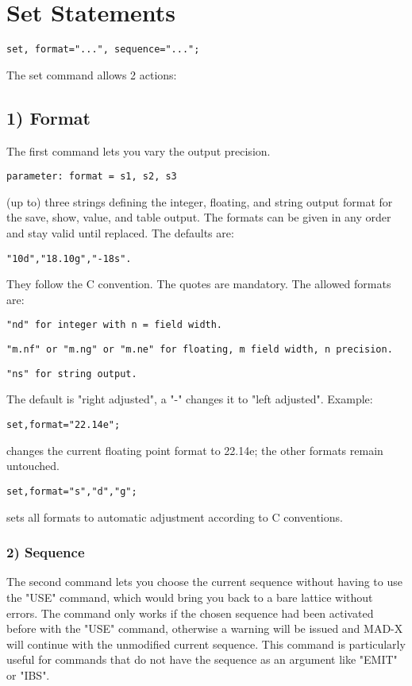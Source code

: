 
\section{Set Statements}

\begin{verbatim}
set, format="...", sequence="...";
\end{verbatim} 

The set command allows 2 actions: 
\subsection{1) Format} 
The first command lets you vary the output precision. 
\begin{verbatim}
parameter: format = s1, s2, s3
\end{verbatim} 
(up to) three strings defining the integer, floating, and string output
format for the save, show, value, and table output. The formats can be
given in any order and stay valid until replaced. The defaults are:  
\begin{verbatim}
"10d","18.10g","-18s".
\end{verbatim} 
They follow the C convention. The quotes are mandatory. The allowed formats are: 
\begin{verbatim}
"nd" for integer with n = field width.
\end{verbatim}
\begin{verbatim}
"m.nf" or "m.ng" or "m.ne" for floating, m field width, n precision.
\end{verbatim}
\begin{verbatim}
"ns" for string output.
\end{verbatim} 
The default is "right adjusted", a "-" changes it to "left adjusted".  Example: 
\begin{verbatim}
set,format="22.14e";
\end{verbatim} 
changes the current floating point format to 22.14e; the other formats remain untouched. 
\begin{verbatim}
set,format="s","d","g";
\end{verbatim} 
sets all formats to automatic adjustment according to C conventions. 

\subsubsection{2) Sequence} The second command lets you choose the
current sequence without having to use the "USE" command, which would
bring you back to a bare lattice without errors. The command only works
if the chosen sequence had been activated before with the "USE" command,
otherwise a warning will be issued and MAD-X will continue with the
unmodified current sequence. This command is particularly useful for
commands that do not have the sequence as an argument like "EMIT" or
"IBS". 


